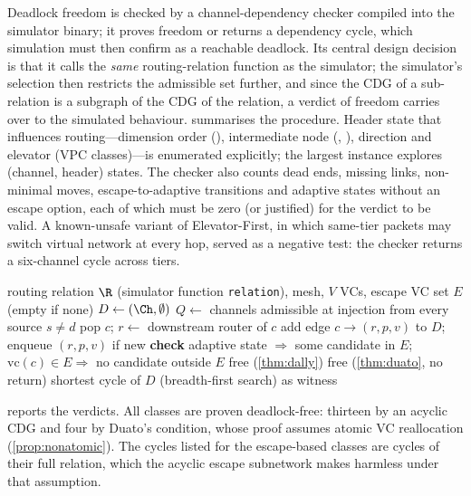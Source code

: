 Deadlock freedom is checked by a channel-dependency checker compiled into the simulator binary; it proves freedom or returns a dependency cycle, which simulation must then confirm as a reachable deadlock. Its central design decision is that it calls the \emph{same} routing-relation function as the simulator; the simulator's selection then restricts the admissible set further, and since the CDG of a sub-relation is a subgraph of the CDG of the relation, a verdict of freedom carries over to the simulated behaviour.  summarises the procedure. Header state that influences routing---dimension order (), intermediate node (, ), direction and elevator (VPC classes)---is enumerated explicitly; the largest instance explores  (channel, header) states. The checker also counts dead ends, missing links, non-minimal moves, escape-to-adaptive transitions and adaptive states without an escape option, each of which must be zero (or justified) for the verdict to be valid. A known-unsafe variant of Elevator-First, in which same-tier packets may switch virtual network at every hop, served as a negative test: the checker returns a six-channel cycle across tiers.

\begin{algorithm}[tbp]
\caption{Channel-dependency verification of a routing class}
\label{alg:checker}
\small
\begin{algorithmic}[1]
\Require routing relation $\R$ (simulator function \texttt{relation}), mesh, $V$ VCs, escape VC set $E$ (empty if none)
\State $D\gets(\Ch,\emptyset)$
  \State $Q\gets$ channels admissible at injection from every source $s\neq d$
    \State pop $c$; $r\gets$ downstream router of $c$
       add edge $c\to(r,p,v)$ to $D$; enqueue $(r,p,v)$ if new \EndFor
    \EndFor
    \State \textbf{check} adaptive state $\Rightarrow$ some candidate in $E$; $\text{vc}(c)\in E\Rightarrow$ no candidate outside $E$
  \EndWhile
\EndFor
{} \Return free (\cref{thm:dally})
 \Return free (\cref{thm:duato}, no return)
\Else{} \Return shortest cycle of $D$ (breadth-first search) as witness
\EndIf
\end{algorithmic}
\end{algorithm}

 reports the verdicts. All  classes are proven deadlock-free: thirteen by an acyclic CDG and four by Duato's condition, whose proof assumes atomic VC reallocation (\cref{prop:nonatomic}). The cycles listed for the escape-based classes are cycles of their full relation, which the acyclic escape subnetwork makes harmless under that assumption.

